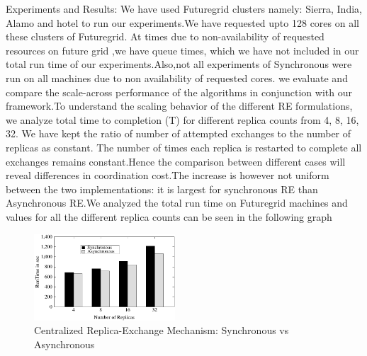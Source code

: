 \documentclass[]{paper}
\begin{document}

Experiments and Results:
We have used Futuregrid clusters namely: Sierra, India, Alamo and hotel to run our experiments.We have requested upto 128 cores on all these clusters of Futuregrid. At times due to non-availability of requested resources on future grid ,we have queue times, which we have not included in our total run time of our experiments.Also,not all experiments of Synchronous were run on all machines due to non availability of requested cores. we evaluate and compare the scale-across performance of the algorithms in conjunction with our framework.To understand the scaling behavior of the different RE formulations, we analyze total time to completion (T) for different replica counts from 4, 8, 16, 32. We have kept the ratio of number of attempted exchanges to the number of replicas as constant. The number of times each replica is restarted to complete all exchanges remains constant.Hence the comparison between different cases will reveal differences in coordination cost.The increase is however not uniform between the two 
implementations: it is largest for synchronous RE than Asynchronous RE.We analyzed the total run time on Futuregrid machines and values for all the different replica counts can be seen in the following graph
\begin{figure}[t]
	\centering
\includegraphics[width=0.47\textwidth]{figures/FG_RE.pdf}
\caption{Centralized Replica-Exchange Mechanism: Synchronous vs Asynchronous} 	
\label{figure(i)}
\end{figure}		
\end{document}
